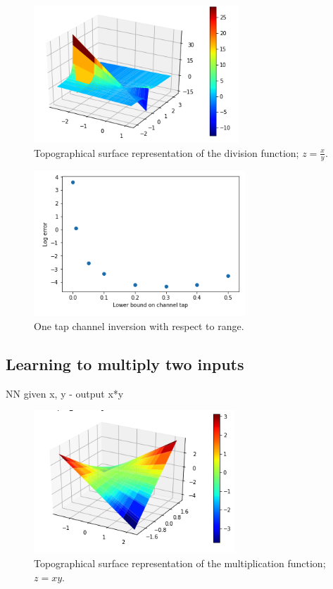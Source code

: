 \begin{figure}
\begin{center}
\includegraphics{figures/equal/plot_of_division_function.png}
\caption{Topographical surface representation of the division function; $z=\frac{x}{y}$.}
\end{center}
\label{fig:div_fx}
\end{figure}

\begin{figure}
\begin{center}
\includegraphics{figures/equal/One_tap_channel_inversion.png}
\caption{One tap channel inversion with respect to range.}
\end{center}
\label{fig:one_tap_inv}
\end{figure}

\subsection{Learning to multiply two inputs}
NN given x, y - output x*y

\begin{figure}
\begin{center}
\includegraphics{figures/equal/plot_of_multiplication_func.png}
\caption{Topographical surface representation of the multiplication function; $z=xy$.}
\end{center}
\label{fig:mult_fx}
\end{figure}

